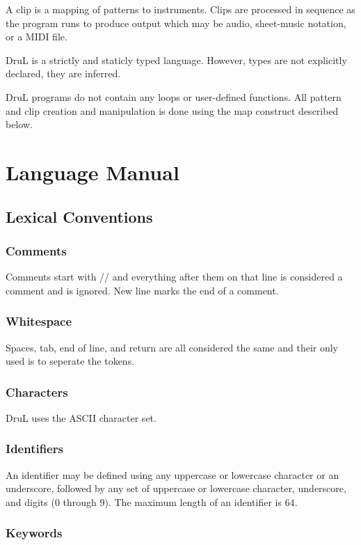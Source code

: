 \documentclass[11pt,twoside]{article}
\begin{document}
A clip is a mapping of patterns to instruments. Clips are processed in sequence as the program runs to produce output which may be audio, sheet-music notation, or a MIDI file.

DruL is a strictly and staticly typed language. However, types are not explicitly declared, they are inferred.

DruL programs do not contain any loops or user-defined functions.  All pattern 
and clip creation and manipulation is done using the map construct described below.

\section{Language Manual}

\subsection{Lexical Conventions}

\subsubsection{Comments}
Comments start with // and everything after them on that line
is considered a comment and is ignored. New line marks the end
of a comment.
\subsubsection{Whitespace}
Spaces, tab, end of line, and return are all considered the same 
and their only used is to seperate the tokens.

\subsubsection{Characters}
DruL uses the ASCII character set.

\subsubsection{Identifiers}
An identifier may be defined using any uppercase or lowercase character
or an underscore, followed by any set of uppercase or lowercase character,
underscore, and digits ($0$ through $9$). The maximum length of an identifier
is $64$.

\subsubsection{Keywords}
\end{document}
